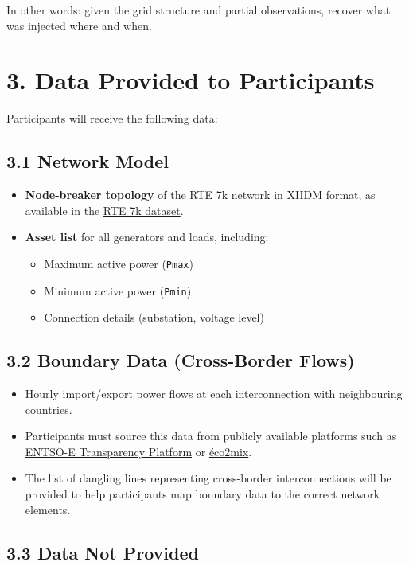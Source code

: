 \documentclass[11pt,a4paper]{article}
\begin{document}
In other words: given the grid structure and partial observations, recover what was injected where and when.

\section{3. Data Provided to Participants}

Participants will receive the following data:

\subsection{3.1 Network Model}

\begin{itemize}[nosep]
  \item \textbf{Node-breaker topology} of the RTE 7k network in XIIDM format, as available in the \href{https://huggingface.co/datasets/OpenSynth/}{RTE 7k dataset}.
  \item \textbf{Asset list} for all generators and loads, including:
  \begin{itemize}[nosep]
    \item Maximum active power (\texttt{Pmax})
    \item Minimum active power (\texttt{Pmin})
    \item Connection details (substation, voltage level)
  \end{itemize}
\end{itemize}

\subsection{3.2 Boundary Data (Cross-Border Flows)}

\begin{itemize}[nosep]
  \item Hourly import/export power flows at each interconnection with neighbouring countries.
  \item Participants must source this data from publicly available platforms such as \href{https://transparency.entsoe.eu/}{ENTSO-E Transparency Platform} or \href{https://www.rte-france.com/eco2mix}{\'eco2mix}.
  \item The list of dangling lines representing cross-border interconnections will be provided to help participants map boundary data to the correct network elements.
\end{itemize}

\subsection{3.3 Data Not Provided}
\end{document}

